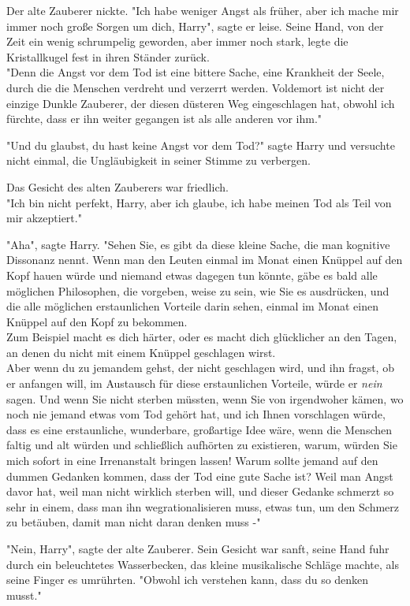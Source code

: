 {Der alte Zauberer nickte. "Ich habe weniger Angst als früher, aber ich mache mir immer noch große Sorgen um dich, Harry", sagte er leise. Seine Hand, von der Zeit ein wenig schrumpelig geworden, aber immer noch stark, legte die Kristallkugel fest in ihren Ständer zurück.\\ "Denn die Angst vor dem Tod ist eine bittere Sache, eine Krankheit der Seele, durch die die Menschen verdreht und verzerrt werden. Voldemort ist nicht der einzige Dunkle Zauberer, der diesen düsteren Weg eingeschlagen hat, obwohl ich fürchte, dass er ihn weiter gegangen ist als alle anderen vor ihm."

"Und du glaubst, du hast keine Angst vor dem Tod?" sagte Harry und versuchte nicht einmal, die Ungläubigkeit in seiner Stimme zu verbergen.

Das Gesicht des alten Zauberers war friedlich.\\ "Ich bin nicht perfekt, Harry, aber ich glaube, ich habe meinen Tod als Teil von mir akzeptiert."

"Aha", sagte Harry. "Sehen Sie, es gibt da diese kleine Sache, die man kognitive Dissonanz nennt. Wenn man den Leuten einmal im Monat einen Knüppel auf den Kopf hauen würde und niemand etwas dagegen tun könnte, gäbe es bald alle möglichen Philosophen, die vorgeben, weise zu sein, wie Sie es ausdrücken, und die alle möglichen erstaunlichen Vorteile darin sehen, einmal im Monat einen Knüppel auf den Kopf zu bekommen.\\ Zum Beispiel macht es dich härter, oder es macht dich glücklicher an den Tagen, an denen du nicht mit einem Knüppel geschlagen wirst.\\ Aber wenn du zu jemandem gehst, der nicht geschlagen wird, und ihn fragst, ob er anfangen will, im Austausch für diese erstaunlichen Vorteile, würde er \emph{nein} sagen. Und wenn Sie nicht sterben müssten, wenn Sie von irgendwoher kämen, wo noch nie jemand etwas vom Tod gehört hat, und ich Ihnen vorschlagen würde, dass es eine erstaunliche, wunderbare, großartige Idee wäre, wenn die Menschen faltig und alt würden und schließlich aufhörten zu existieren, warum, würden Sie mich sofort in eine Irrenanstalt bringen lassen! Warum sollte jemand auf den dummen Gedanken kommen, dass der Tod eine gute Sache ist? Weil man Angst davor hat, weil man nicht wirklich sterben will, und dieser Gedanke schmerzt so sehr in einem, dass man ihn wegrationalisieren muss, etwas tun, um den Schmerz zu betäuben, damit man nicht daran denken muss -"

"Nein, Harry", sagte der alte Zauberer. Sein Gesicht war sanft, seine Hand fuhr durch ein beleuchtetes Wasserbecken, das kleine musikalische Schläge machte, als seine Finger es umrührten. "Obwohl ich verstehen kann, dass du so denken musst."

}

